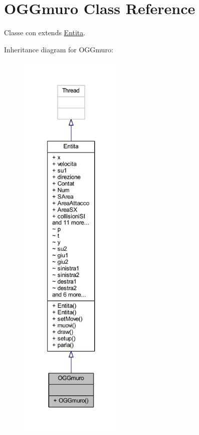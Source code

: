 \hypertarget{classoggetti_1_1_o_g_gmuro}{}\section{O\+G\+Gmuro Class Reference}
\label{classoggetti_1_1_o_g_gmuro}


Classe con extends \hyperlink{namespace_entita}{Entita}.  




Inheritance diagram for O\+G\+Gmuro\+:
\nopagebreak
\begin{figure}[H]
\begin{center}
\leavevmode
\includegraphics[height=550pt]{classoggetti_1_1_o_g_gmuro__inherit__graph}
\end{center}
\end{figure}


